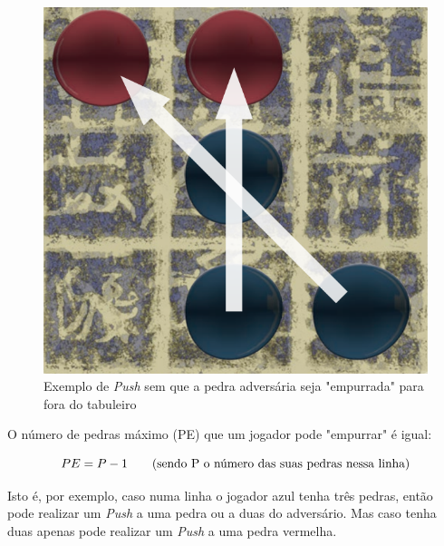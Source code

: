\documentclass[a4paper]{article}
\begin{document}
\begin{figure}[!htb]
\centering
\includegraphics[scale=0.3]{push.png} 
\caption{Exemplo de \textit{Push} sem que a pedra adversária seja "empurrada" para fora do tabuleiro}
\end{figure}

\newpage

O número de pedras máximo (PE) que um jogador pode "empurrar" é igual:

\begin{equation}
PE = P - 1 \text{\hspace{7mm}(sendo P o número das suas pedras nessa linha)}
\end{equation}

Isto é, por exemplo, caso numa linha o jogador azul tenha três pedras, então pode realizar um  \textit{Push} a uma pedra ou a duas do adversário. Mas caso tenha duas apenas pode realizar um  \textit{Push} a uma pedra vermelha.
\end{document}
